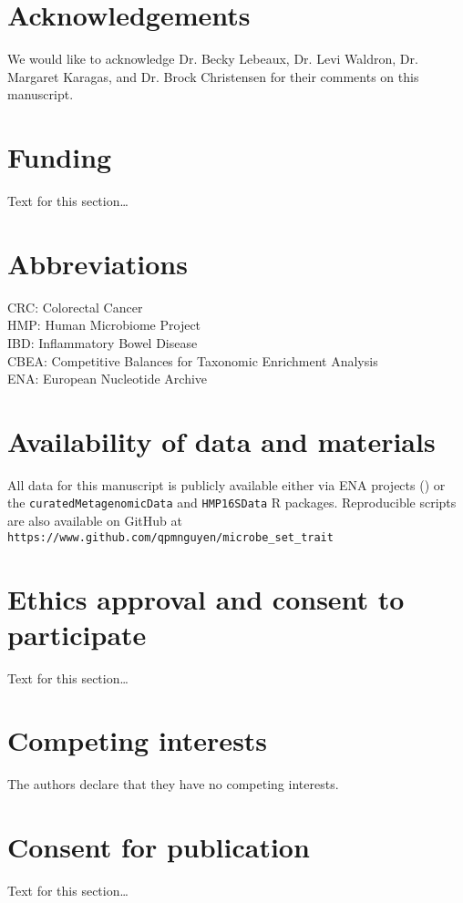 \documentclass{bmcart}
\begin{document}
\begin{backmatter}

\section*{Acknowledgements}%
We would like to acknowledge Dr. Becky Lebeaux, Dr. Levi Waldron, Dr. Margaret Karagas, and Dr. Brock Christensen for their comments on this manuscript. 

\section*{Funding}%
Text for this section\ldots

\section*{Abbreviations}%
CRC: Colorectal Cancer \\
HMP: Human Microbiome Project \\ 
IBD: Inflammatory Bowel Disease \\
CBEA: Competitive Balances for Taxonomic Enrichment Analysis \\
ENA: European Nucleotide Archive \\

\section*{Availability of data and materials}%
All data for this manuscript is publicly available either via ENA projects () or the \texttt{curatedMetagenomicData} and \texttt{HMP16SData} R packages. Reproducible scripts are also available on GitHub at \texttt{https://www.github.com/qpmnguyen/microbe\_set\_trait}

\section*{Ethics approval and consent to participate}%
Text for this section\ldots

\section*{Competing interests}
The authors declare that they have no competing interests.

\section*{Consent for publication}%
Text for this section\ldots


\end{backmatter}
\end{document}
